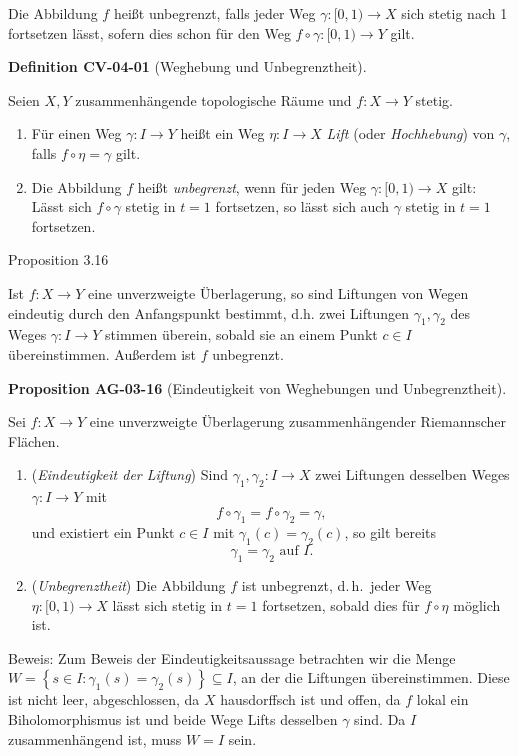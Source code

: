 \documentclass[10pt, letterpaper]{article}
\newcommand{\CustomHeading}[3]{%
  \par\medskip\noindent%
  \textbf{#1 #2} \textnormal{(#3)}.\enskip%
}
\newenvironment{DEF}[2]{\begin{unitbox}\CustomHeading{Definition}{#1}{#2}}{\end{unitbox}}
\newenvironment{PROP}[2]{\begin{unitbox}\CustomHeading{Proposition}{#1}{#2}}{\end{unitbox}}
\begin{document}
Die Abbildung $f$ heißt unbegrenzt, falls jeder Weg $\gamma:[0,1) \rightarrow X$ sich stetig nach 1 fortsetzen lässt, sofern dies schon für den Weg $f \circ \gamma:[0,1) \rightarrow Y$ gilt.


\begin{DEF}{CV-04-01}{Weghebung und Unbegrenztheit}
Seien $X,Y$ zusammenhängende topologische Räume und $f:X\to Y$ stetig.
\begin{enumerate}
\item Für einen Weg $\gamma:I\to Y$ heißt ein Weg $\eta:I\to X$ \emph{Lift} (oder \emph{Hochhebung}) von $\gamma$, falls $f\circ\eta=\gamma$ gilt.
\item Die Abbildung $f$ heißt \emph{unbegrenzt}, wenn für jeden Weg $\gamma:[0,1)\to X$ gilt:
Lässt sich $f\circ\gamma$ stetig in $t=1$ fortsetzen, so lässt sich auch $\gamma$ stetig in $t=1$ fortsetzen.
\end{enumerate}
\end{DEF}

Proposition 3.16 

Ist $f: X \rightarrow Y$ eine unverzweigte Überlagerung, so sind Liftungen von Wegen eindeutig durch den Anfangspunkt bestimmt, d.h. zwei Liftungen $\gamma_{1}, \gamma_{2}$ des Weges $\gamma: I \rightarrow Y$ stimmen überein, sobald sie an einem Punkt $c \in I$ übereinstimmen. Außerdem ist $f$ unbegrenzt.

\begin{PROP}{AG-03-16}{Eindeutigkeit von Weghebungen und Unbegrenztheit}
Sei $f:X\to Y$ eine unverzweigte Überlagerung zusammenhängender Riemannscher Flächen.

\begin{enumerate}
\item (\emph{Eindeutigkeit der Liftung})  
Sind $\gamma_1,\gamma_2:I\to X$ zwei Liftungen desselben Weges $\gamma:I\to Y$ mit  
\[
f\circ\gamma_1=f\circ\gamma_2=\gamma,
\]
und existiert ein Punkt $c\in I$ mit $\gamma_1(c)=\gamma_2(c)$, so gilt bereits
\[
\gamma_1=\gamma_2 \text{ auf } I.
\]

\item (\emph{Unbegrenztheit})  
Die Abbildung $f$ ist unbegrenzt, d.\,h.\ jeder Weg $\eta:[0,1)\to X$ lässt sich stetig in $t=1$ fortsetzen, sobald dies für $f\circ\eta$ möglich ist.
\end{enumerate}
\end{PROP}


Beweis: Zum Beweis der Eindeutigkeitsaussage betrachten wir die Menge $W=\left\{s \in I: \gamma_{1}(s)=\gamma_{2}(s)\right\} \subseteq I$, an der die Liftungen übereinstimmen. Diese ist nicht leer, abgeschlossen, da $X$ hausdorffsch ist und offen, da $f$ lokal ein Biholomorphismus ist und beide Wege Lifts desselben $\gamma$ sind. Da $I$ zusammenhängend ist, muss $W=I$ sein.
\end{document}
